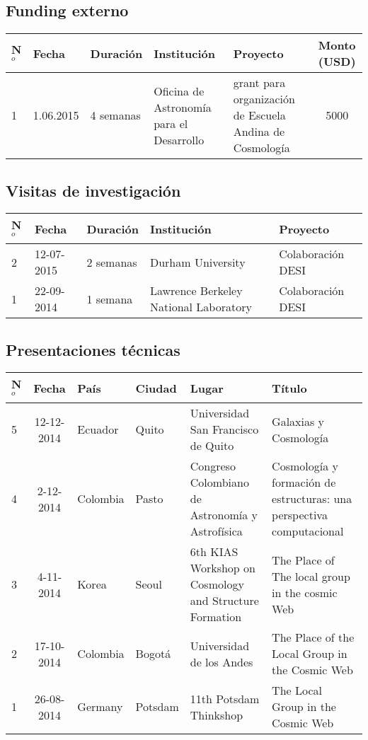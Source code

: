 \documentclass{article}
\begin{document}
\subsection{Funding externo}
\begin{tabular}{l l l p{3.5cm} p{2.3cm} c}\hline
N$^{o}$ & Fecha & Duraci\'on & Instituci\'on & Proyecto & Monto (USD)\\\hline
1 & 1.06.2015 & 4 semanas & Oficina de Astronom\'ia para el Desarrollo
& grant para organizaci\'on de Escuela Andina de Cosmolog\'ia & 5000
\\\hline 
\end{tabular}

\subsection{Visitas de investigaci\'on}

\begin{tabular}{l l l p{3.5cm} p{5.0cm}}\hline
N$^{o}$ & Fecha & Duraci\'on & Instituci\'on & Proyecto \\\hline
2 & 12-07-2015 & 2 semanas & Durham University & Colaboraci\'on DESI\\
1 & 22-09-2014 & 1 semana & Lawrence Berkeley National
Laboratory & Colaboraci\'on DESI\\\hline
\end{tabular}

\subsection{Presentaciones t\'ecnicas}

\begin{tabular}{l c l l p{2cm} p{5cm}}\hline
N$^{o}$ & Fecha & Pa\'is & Ciudad & Lugar & T\'itulo \\\hline
5 & 12-12-2014 & Ecuador & Quito & Universidad San Francisco de Quito & Galaxias y Cosmolog\'ia\\
4 & 2-12-2014 & Colombia & Pasto & Congreso Colombiano de Astronom\'ia y Astrof\'isica & Cosmolog\'ia y formaci\'on de estructuras: una perspectiva computacional\\
3 & 4-11-2014 & Korea & Seoul & 6th KIAS Workshop on Cosmology and Structure Formation & The Place of The local group in the cosmic Web\\
2 & 17-10-2014 & Colombia & Bogot\'a & Universidad de los Andes & The
Place of the Local Group in the Cosmic Web\\
1 & 26-08-2014 & Germany & Potsdam & 11th Potsdam Thinkshop & The Local
Group in the Cosmic Web\\ \hline
\end{tabular}
\end{document}
